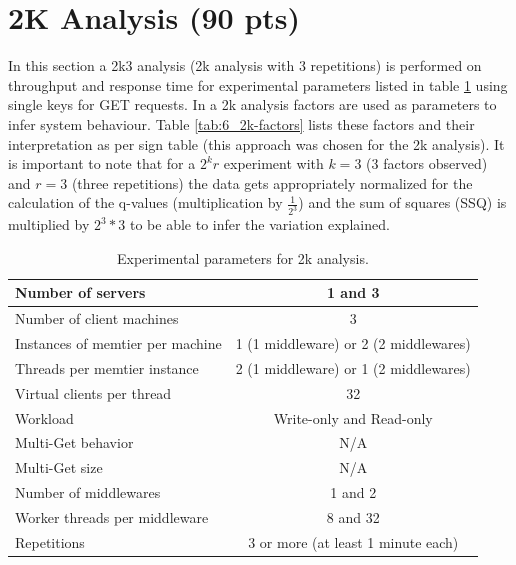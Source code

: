 \section{2K Analysis (90 pts)\label{sec:6}}

    In this section a 2k3 analysis (2k analysis with 3 repetitions) is performed on throughput and response time for
    experimental parameters listed in table \ref{tab:6_setup} using single keys for GET requests. In a 2k analysis
    factors are used as parameters to infer system behaviour. Table \ref{tab:6_2k-factors} lists these factors and their
    interpretation as per sign table (this approach was chosen for the 2k analysis). It is important to note that for a
    $2^k r$ experiment with $k = 3$ (3 factors observed) and $r = 3$ (three repetitions) the data gets appropriately
    normalized for the calculation of the q-values (multiplication by $\tfrac{1}{2^3}$) and the sum of squares (SSQ) is
    multiplied by $2^3 * 3$ to be able to infer the variation explained.

    \begin{table}
        \scriptsize{
            \begin{tabular}{|l|c|}
                \hline Number of servers                & 1 and 3 \\
                \hline Number of client machines        & 3 \\
                \hline Instances of memtier per machine & 1 (1 middleware) or 2 (2 middlewares) \\
                \hline Threads per memtier instance     & 2 (1 middleware) or 1 (2 middlewares) \\
                \hline Virtual clients per thread       & 32 \\
                \hline Workload                         & Write-only and Read-only \\
                \hline Multi-Get behavior               & N/A \\
                \hline Multi-Get size                   & N/A \\
                \hline Number of middlewares            & 1 and 2 \\
                \hline Worker threads per middleware    & 8 and 32 \\
                \hline Repetitions                      & 3 or more (at least 1 minute each) \\
                \hline
            \end{tabular}
        \caption{Experimental parameters for 2k analysis.\label{tab:6_setup}}
        }
    \end{table}

